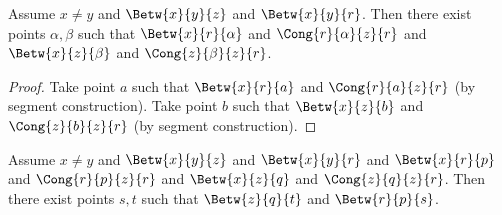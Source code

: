 \documentclass[10pt,a4paper,parskip=half,numbers=endperiod,parskip]{scrartcl}
\begin{document}



  \begin{forthel}
    \begin{lemma}
      Assume $x \neq y$ and $\Betw{x}{y}{z}$ and $\Betw{x}{y}{r}$.
      Then there exist points $\alpha,\beta$ such that
      $\Betw{x}{r}{\alpha}$ and
      $\Cong{r}{\alpha}{z}{r}$ and
      $\Betw{x}{z}{\beta}$ and
      $\Cong{z}{\beta}{z}{r}$.
    \end{lemma}
    \begin{proof}
      Take point $a$ such that $\Betw{x}{r}{a}$ and $\Cong{r}{a}{z}{r}$ (by segment construction).
      Take point $b$ such that $\Betw{x}{z}{b}$ and $\Cong{z}{b}{z}{r}$ (by segment construction).
    \end{proof}



    \begin{lemma}
      Assume $x \neq y$ and
        $\Betw{x}{y}{z}$ and
        $\Betw{x}{y}{r}$ and
        $\Betw{x}{r}{p}$ and
        $\Cong{r}{p}{z}{r}$ and
        $\Betw{x}{z}{q}$ and
        $\Cong{z}{q}{z}{r}$.
      Then there exist points $s, t$ such that $\Betw{z}{q}{t}$ and $\Betw{r}{p}{s}$.
    \end{lemma}

  \end{forthel}
\end{document}
